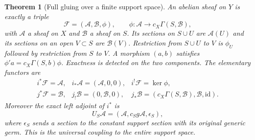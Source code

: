 \documentclass[11pt,a4paper]{article}
\newtheorem{theorem}{Theorem}[section]
\theoremstyle{definition}\newtheorem{definition}[theorem]{Definition}
\begin{document}
\begin{theorem}[Full gluing over a finite support space]
\label{FL:thm:finite-gluing}
An abelian sheaf on $Y$ is exactly a triple
\[
 \mathcal F=(\mathcal A,\mathcal B,\phi),\qquad
 \phi:\mathcal A\longrightarrow c_X\Gamma(S,\mathcal B),
 \tag{FL8}\label{FL:eq:triple}
\]
with $\mathcal A$ a sheaf on $X$ and $\mathcal B$ a sheaf on $S$.
Its sections on $S\cup U$ are $\mathcal A(U)$ and its sections on an
open $V\subset S$ are $\mathcal B(V)$. Restriction from $S\cup U$ to
$V$ is $\phi_U$ followed by restriction from $S$ to $V$.
A morphism $(a,b)$ satisfies
$\phi'a=c_X\Gamma(S,b)\phi$. Exactness is detected on the two
components. The elementary functors are
\[
\begin{array}{lll}
 i^*\mathcal F=\mathcal A,&i_*\mathcal A=(\mathcal A,0,0),&
 i^!\mathcal F=\ker\phi,\\
 j^*\mathcal F=\mathcal B,&j_!\mathcal B=(0,\mathcal B,0),&
 j_*\mathcal B=(c_X\Gamma(S,\mathcal B),\mathcal B,\mathrm{id}).
\end{array}
 \tag{FL9}\label{FL:eq:functors}
\]
Moreover the exact left adjoint of $i^*$ is
\[
 U_S\mathcal A=
 (\mathcal A,c_Sg\mathcal A,\epsilon_S),
 \tag{FL10}\label{FL:eq:universal}
\]
where $\epsilon_S$ sends a section to the constant support section
with its original generic germ. This is the universal coupling to
the entire support space.
\end{theorem}
\end{document}
